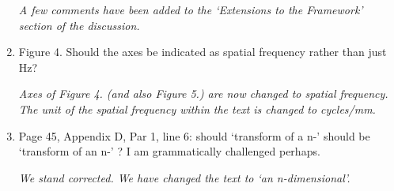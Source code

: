 \documentclass{article}
\begin{document}
\begin{enumerate}
\emph{A few comments have been added to the `Extensions to the Framework' section of the discussion.}

\item Figure 4. Should the axes be indicated as spatial frequency rather than just Hz?

\emph{Axes of Figure 4. (and also Figure 5.) are now changed to spatial frequency. The unit of the spatial frequency within the text is changed to cycles/mm.}

\item Page 45, Appendix D, Par 1, line 6: should `transform of a n-' should be `transform of an n-' ? I am grammatically challenged perhaps.

\emph{We stand corrected. We have changed the text to `an n-dimensional'.}

\end{enumerate}
\end{document}
